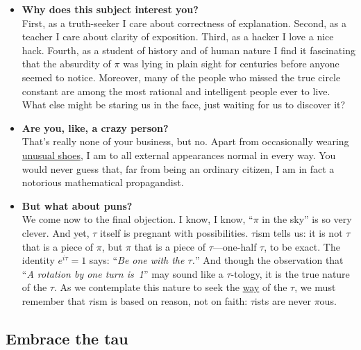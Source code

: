 \begin{itemize}
  \item \textbf{Why does this subject interest you?} \\ First, as a truth-seeker I care about correctness of explanation. Second, as a teacher I care about clarity of exposition. Third, as a hacker I love a nice hack. Fourth, as a student of history and of human nature I find it fascinating that the absurdity of $\pi$ was lying in plain sight for centuries before anyone seemed to notice. Moreover, many of the people who missed the true circle constant are among the most rational and intelligent people ever to live. What else might be staring us in the face, just waiting for us to discover it?

  \item \textbf{Are you, like, a crazy person?} \\ That's really none of your business, but no. Apart from occasionally wearing \href{https://en.wikipedia.org/wiki/Vibram_FiveFingers}{unusual shoes}, I am to all external appearances normal in every way. You would never guess that, far from being an ordinary citizen, I am in fact a notorious mathematical propagandist.

  \item \textbf{But what about puns?} \\ We come now to the final objection. I know, I know, ``$\pi$ in the sky'' is so very clever. And yet, $\tau$ itself is pregnant with possibilities. $\tau$ism tells us: it is not $\tau$ that is a piece of $\pi$, but $\pi$ that is a piece of $\tau$---one-half $\tau$, to be exact. The identity $e^{i\tau} = 1$ says: ``\emph{Be one with the $\tau$.}'' And though the observation that ``\emph{A rotation by one turn is~1}'' may sound like a $\tau$-tology, it is the true nature of the $\tau$. As we contemplate this nature to seek the \href{https://en.wikipedia.org/wiki/Tao}{way} of the $\tau$, we must remember that $\tau$ism is based on reason, not on faith: $\tau$ists are never $\pi$ous.

\end{itemize}


  \subsection{Embrace the tau} %
  \label{sec:embrace_the_tau}

